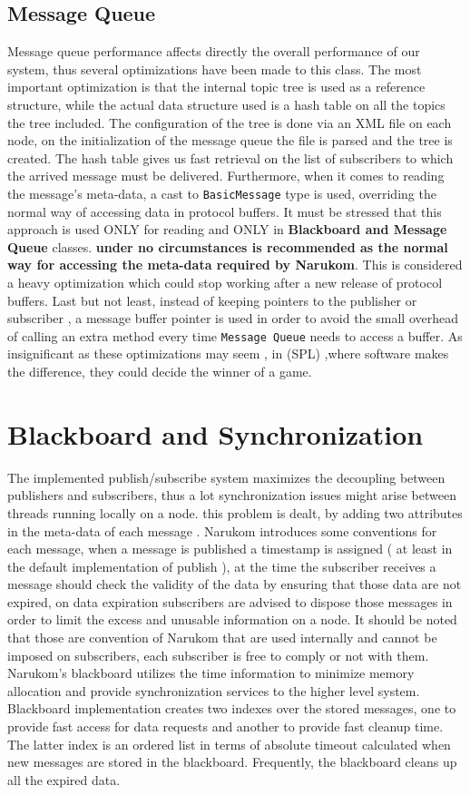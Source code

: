 \subsection{Message Queue}
Message queue performance affects directly the overall performance of our system, thus several optimizations have been made to this class. The most
important optimization is that the internal topic tree is used as a reference structure, while the actual data structure used is a hash table on all the  topics the tree included. The configuration of the tree is done via an XML file on each node, on the initialization of the message queue the file is parsed and the tree is created.
 The hash table gives us fast retrieval on the list of subscribers to which the arrived message must be delivered. Furthermore, when it comes to reading  the message's meta-data, a cast to  {\tt BasicMessage} type is used, overriding the normal way of accessing
data in protocol buffers. It must be stressed that this approach is used ONLY for reading and ONLY in \textbf{Blackboard and Message Queue} classes. \textbf{under no circumstances is recommended as the normal way for accessing the meta-data required by Narukom}. This is considered a heavy optimization which could stop working after a new release of protocol buffers.  Last but not least, instead of keeping pointers to the publisher or subscriber , a message buffer pointer is used in order to avoid the small overhead of calling an extra method every time {\tt Message Queue} needs to access a buffer. As insignificant as these optimizations may seem , in (SPL) ,where software makes the difference, they could decide the winner of a game.

\section{Blackboard and Synchronization}
The implemented publish/subscribe system maximizes the decoupling between publishers and subscribers, thus a lot synchronization issues might arise between
threads running locally on a node. this problem is dealt, by adding two attributes in the meta-data of each message . Narukom introduces some conventions for
each message, when a message is published a timestamp is assigned ( at least in the default implementation of publish ), at the time the subscriber receives a
message should check the validity of the data by ensuring that those data are not expired, on data expiration subscribers are advised to dispose those
messages in order to limit the excess and unusable information on a node. It should be noted that those are convention of Narukom that are used internally and
cannot be imposed on subscribers, each subscriber is free to comply or not with them. Narukom's blackboard utilizes the time information to minimize memory
allocation and provide synchronization services to the higher level system. Blackboard implementation creates two indexes over the stored messages, one to
provide fast access for data requests and another to provide fast cleanup time. The latter index is an ordered list in terms of absolute timeout calculated
when new messages are stored in the blackboard. Frequently, the blackboard cleans up all the expired data.


